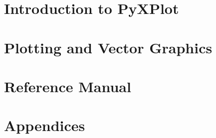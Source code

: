 \documentclass[a4paper,onecolumn,10pt]{book}
\begin{document}
\listoffigures
{}

\newpage
{}

\part{Introduction to PyXPlot}






\part{Plotting and Vector Graphics}



\part{Reference Manual}








\part{Appendices}
\appendix





\printindex
\end{document}
